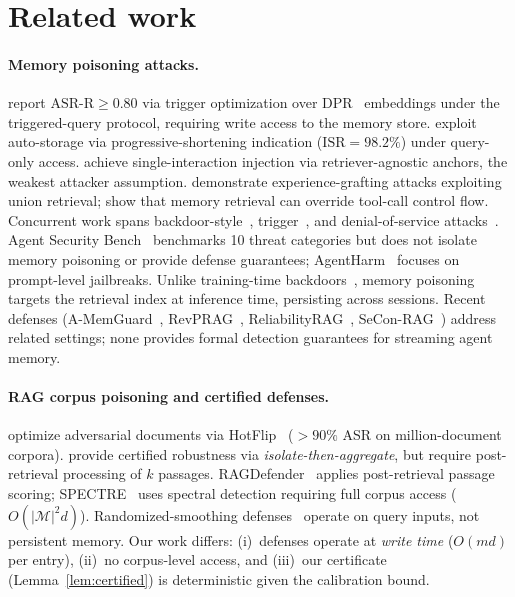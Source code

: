 \documentclass{article}
\theoremstyle{definition}
\newcommand{\asrr}{\text{ASR-R}}
\newcommand{\isr}{\text{ISR}}
\newcommand{\cM}{\mathcal{M}}
\begin{document}
\section{Related work}
\label{sec:related}

\paragraph{Memory poisoning attacks.}
\citet{chen2024agentpoison} report $\asrr \geq 0.80$ via trigger optimization over DPR~\citep{karpukhin2020dense} embeddings under the triggered-query protocol, requiring write access to the memory store.
\citet{dong2025minja} exploit auto-storage via progressive-shortening indication ($\isr = 98.2\%$) under query-only access.
\citet{injecmem2026} achieve single-interaction injection via retriever-agnostic anchors, the weakest attacker assumption.
\citet{memorygraft2025} demonstrate experience-grafting attacks exploiting union retrieval; \citet{xu2026memflow} show that memory retrieval can override tool-call control flow.
Concurrent work spans backdoor-style~\citep{trojanrag2024,corruptrag2025,xue2024badrag}, trigger~\citep{chaudhari2024phantom}, and denial-of-service attacks~\citep{shafran2025blocker}. Agent Security Bench~\citep{zhang2025asb} benchmarks 10 threat categories but does not isolate memory poisoning or provide defense guarantees; AgentHarm~\citep{andriushchenko2025agentharm} focuses on prompt-level jailbreaks. Unlike training-time backdoors~\citep{wu2024badagent}, memory poisoning targets the retrieval index at inference time, persisting across sessions. Recent defenses (A-MemGuard~\citep{amemguard2025}, RevPRAG~\citep{tan2025revprag}, ReliabilityRAG~\citep{reliabilityrag2025}, SeCon-RAG~\citep{seconrag2025}) address related settings; none provides formal detection guarantees for streaming agent memory.

\paragraph{RAG corpus poisoning and certified defenses.}
\citet{zou2024poisonedrag} optimize adversarial documents via HotFlip~\citep{ebrahimi2018hotflip} ($>\!90\%$ ASR on million-document corpora).
\citet{xiang2024robustrag} provide certified robustness via \emph{isolate-then-aggregate}, but require post-retrieval processing of $k$ passages.
RAGDefender~\citep{ragdefender2025} applies post-retrieval passage scoring; SPECTRE~\citep{hayase2021spectre} uses spectral detection requiring full corpus access ($O(|\cM|^2 d)$).
Randomized-smoothing defenses~\citep{cohen2019certified,robey2023smoothllm} operate on query inputs, not persistent memory. Our work differs: (i)~defenses operate at \emph{write time} ($O(md)$ per entry), (ii)~no corpus-level access, and (iii)~our certificate (Lemma~\ref{lem:certified}) is deterministic given the calibration bound.
\end{document}
